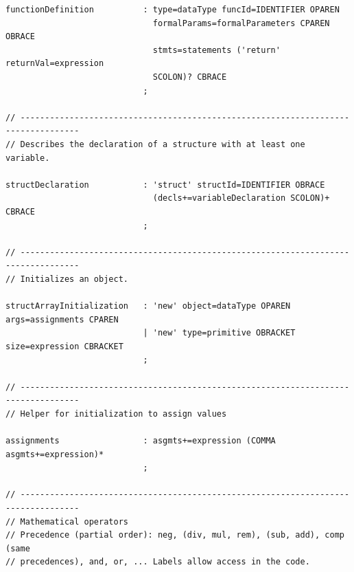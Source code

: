 \begin{lstlisting}[frame=htrbl, caption={Parser rules of grammar {\ttfamily E}}, label={lst:pe}, basicstyle=\scriptsize]
functionDefinition          : type=dataType funcId=IDENTIFIER OPAREN
                              formalParams=formalParameters CPAREN OBRACE
                              stmts=statements ('return' returnVal=expression 
                              SCOLON)? CBRACE
                            ;

// ----------------------------------------------------------------------------------
// Describes the declaration of a structure with at least one variable.

structDeclaration           : 'struct' structId=IDENTIFIER OBRACE
                              (decls+=variableDeclaration SCOLON)+ CBRACE
                            ;

// ----------------------------------------------------------------------------------
// Initializes an object.

structArrayInitialization   : 'new' object=dataType OPAREN args=assignments CPAREN
                            | 'new' type=primitive OBRACKET size=expression CBRACKET
                            ;

// ----------------------------------------------------------------------------------
// Helper for initialization to assign values

assignments                 : asgmts+=expression (COMMA asgmts+=expression)*
                            ;

// ----------------------------------------------------------------------------------
// Mathematical operators
// Precedence (partial order): neg, (div, mul, rem), (sub, add), comp (same
// precedences), and, or, ... Labels allow access in the code.


\end{lstlisting}
